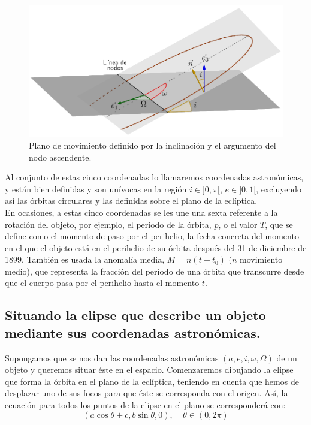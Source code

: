 \documentclass[11pt]{article}
\begin{document}
\begin{figure}[H]
\centering
\includegraphics[scale=0.375]{images/omega_i_5.png}
\caption{Plano de movimiento definido por la inclinación y el argumento del nodo ascendente.}
\label{fig:omega_i}
\end{figure}

Al conjunto de estas cinco coordenadas lo llamaremos coordenadas astronómicas, y están bien definidas y son unívocas en la región $i\in]0,\pi[$, $e\in]0,1[$, excluyendo así las órbitas circulares y las definidas sobre el plano de la eclíptica.\\

En ocasiones, a estas cinco coordenadas se les une una sexta referente a la rotación del objeto, por ejemplo, el período de la órbita, $p$, o el valor $T$, que se define como el momento de paso por el perihelio, la fecha concreta del momento en el que el objeto está en el perihelio de su órbita después del 31 de diciembre de 1899. También es usada la anomalía media, $M=n(t-t_0)$ ($n$ movimiento medio), que representa la fracción del período de una órbita que transcurre desde que el cuerpo pasa por el perihelio hasta el momento $t$.\\

\subsection{Situando la elipse que describe un objeto mediante sus coordenadas astronómicas.}
\label{subsec:set_ellipse_position}
Supongamos que se nos dan las coordenadas astronómicas $(a,e,i,\omega,\Omega)$ de un objeto y queremos situar éste en el espacio. Comenzaremos dibujando la elipse que forma la órbita en el plano de la eclíptica, teniendo en cuenta que hemos de desplazar uno de sus focos para que éste se corresponda con el origen. Así, la ecuación para todos los puntos de la elipse en el plano se corresponderá con:
\[
(a\cos{\theta}+c, b\sin{\theta}, 0), \; \; \; \; \theta\in(0,2\pi)
\]
\end{document}
